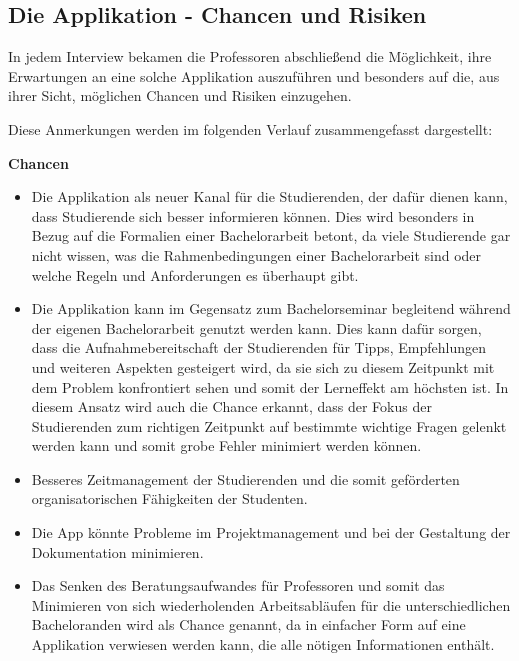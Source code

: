 \documentclass[bibliography=totoc,listof=totoc,BCOR=5mm,DIV=12,oneside]{scrbook}
\begin{document}
\newpage
\subsection{Die Applikation - Chancen und Risiken}
\par In jedem Interview bekamen die Professoren abschließend die Möglichkeit, ihre Erwartungen an eine solche Applikation auszuführen und besonders auf die, aus ihrer Sicht, möglichen Chancen und Risiken einzugehen. 
\par \bigskip Diese Anmerkungen werden im folgenden Verlauf zusammengefasst dargestellt:
\par \bigskip \textbf{Chancen}
\begin{itemize}
\item Die Applikation als neuer Kanal für die Studierenden, der dafür dienen kann, dass Studierende sich besser informieren können. Dies wird besonders in Bezug auf die Formalien einer Bachelorarbeit betont, da viele Studierende gar nicht wissen, was die Rahmenbedingungen einer Bachelorarbeit sind oder welche Regeln und Anforderungen es überhaupt gibt.
\item Die Applikation kann im Gegensatz zum Bachelorseminar begleitend während der eigenen Bachelorarbeit genutzt werden kann. Dies kann dafür sorgen, dass die Aufnahmebereitschaft der Studierenden für Tipps, Empfehlungen und weiteren Aspekten gesteigert wird, da sie sich zu diesem Zeitpunkt mit dem Problem konfrontiert sehen und somit der Lerneffekt am höchsten ist. In diesem Ansatz wird auch die Chance erkannt, dass der Fokus der Studierenden zum richtigen Zeitpunkt auf bestimmte wichtige Fragen gelenkt werden kann und somit grobe Fehler minimiert werden können.
\item Besseres Zeitmanagement der Studierenden und die somit geförderten organisatorischen Fähigkeiten der Studenten.
\item Die App könnte Probleme im Projektmanagement und bei der Gestaltung der Dokumentation minimieren.
\item Das Senken des Beratungsaufwandes für Professoren und somit das Minimieren von sich wiederholenden Arbeitsabläufen für die unterschiedlichen Bacheloranden wird als Chance genannt, da in einfacher Form auf eine Applikation verwiesen werden kann, die alle nötigen Informationen enthält.
\end{itemize}
\end{document}
